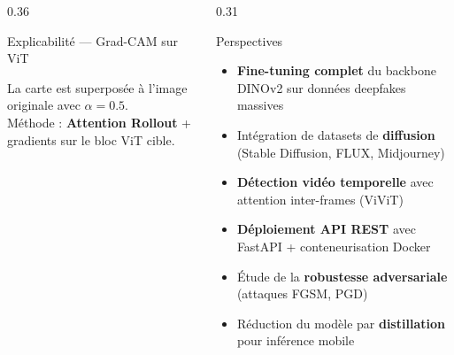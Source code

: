 \documentclass[final]{beamer}
\begin{document}
\begin{frame}[t]
\begin{columns}[t]
\begin{column}{0.36\linewidth}
\begin{block}{Explicabilité — Grad-CAM sur ViT}
\begin{center}
\end{center}

\vspace{4pt}
La carte est superposée à l'image originale avec $\alpha=0.5$.\\
Méthode : \textbf{Attention Rollout} + gradients sur le bloc ViT cible.
\end{block}
\end{column}

\begin{column}{0.31\linewidth}
\begin{block}{Perspectives}
\begin{itemize}[leftmargin=1.4em, itemsep=5pt]
  \item[\textcolor{mainblue}{\textbullet}]
    \textbf{Fine-tuning complet} du backbone DINOv2 sur données deepfakes massives
  \item[\textcolor{mainblue}{\textbullet}]
    Intégration de datasets de \textbf{diffusion} (Stable Diffusion, FLUX, Midjourney)
  \item[\textcolor{mainblue}{\textbullet}]
    \textbf{Détection vidéo temporelle} avec attention inter-frames (ViViT)
  \item[\textcolor{mainblue}{\textbullet}]
    \textbf{Déploiement API REST} avec FastAPI + conteneurisation Docker
  \item[\textcolor{mainblue}{\textbullet}]
    Étude de la \textbf{robustesse adversariale} (attaques FGSM, PGD)
  \item[\textcolor{mainblue}{\textbullet}]
    Réduction du modèle par \textbf{distillation} pour inférence mobile
\end{itemize}


\end{block}
\end{column}
\end{columns}
\end{frame}
\end{document}
